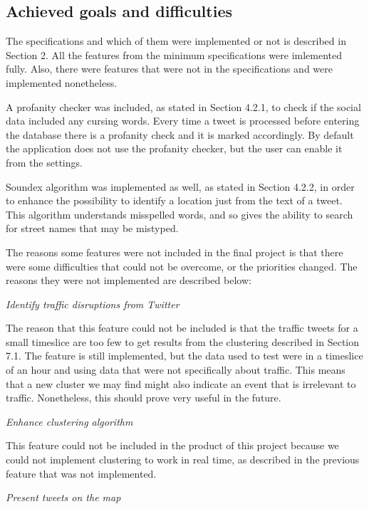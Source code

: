 \subsection{Achieved goals and difficulties}
The specifications and which of them were implemented or not is described in
Section 2. All the features from the minimum specifications were imlemented
fully. Also, there were features that were not in the specifications and were
implemented nonetheless.

A profanity checker was included, as stated in Section 4.2.1, to check if the social data included any
cursing words. Every time a tweet is processed before entering the database
there is a profanity check and it is marked accordingly. By default the
application does not use the profanity checker, but the user can enable it from
the settings.

Soundex algorithm was implemented as well, as stated in Section 4.2.2, in order to enhance the possibility to identify
a location just from the text of a tweet. This algorithm understands
misspelled words, and so gives the ability to search for street names that may
be mistyped.

The reasons some features were not included in the final project is
that there were some difficulties that could not be overcome, or the priorities
changed.
The reasons they were not implemented are described below:

\emph{Identify traffic disruptions from Twitter}

The reason that this feature could not be included is that the traffic tweets
for a small timeslice are too few to get results from the clustering described
in Section 7.1. The feature is still implemented, but the data used to test
were in a timeslice of an hour and using data that were not specifically about
traffic. This means that a new cluster we may find might also indicate an
event that is irrelevant to traffic. Nonetheless, this should prove very useful
in the future.

\emph{Enhance clustering algorithm}

This feature could not be included in the product of this project because we
could not implement clustering to work in real time, as described in the
previous feature that was not implemented.

\emph{Present tweets on the map}
